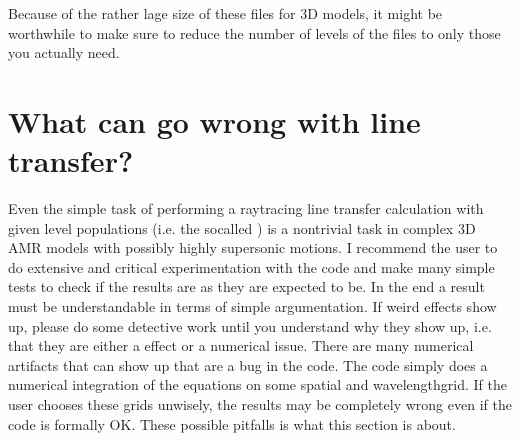 \documentclass[letterpaper,10pt,english]{sphinxmanual}
\begin{document}
Because of the rather lage size of these files for 3\sphinxhyphen{}D models, it might be
worthwhile to make sure to reduce the number of levels of the
 files to only those you actually need.


\section{What can go wrong with line transfer?}
\label{\detokenize{lineradtrans:what-can-go-wrong-with-line-transfer}}\label{\detokenize{lineradtrans:sec-lines-pitfalls}}
Even the simple task of performing a ray\sphinxhyphen{}tracing line transfer calculation
with given level populations (i.e. the so\sphinxhyphen{}called ) is a non\sphinxhyphen{}trivial task in complex 3\sphinxhyphen{}D AMR models with possibly
highly supersonic motions. I recommend the user to do extensive and critical
experimentation with the code and make many simple tests to check if the
results are as they are expected to be. In the end a result must be
understandable in terms of simple argumentation. If weird effects show up,
please do some detective work until you understand why they show up, i.e.
that they are either a  effect or a numerical issue. There are
many numerical artifacts that can show up that are  a bug in the
code. The code simply does a numerical integration of the equations on some
spatial\sphinxhyphen{} and wavelength\sphinxhyphen{}grid. If the user chooses these grids unwisely, the
results may be completely wrong even if the code is formally OK. These
possible pitfalls is what this section is about.
\end{document}
